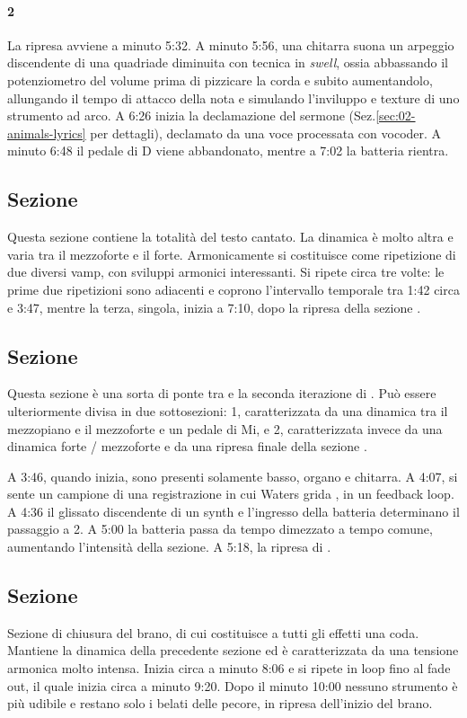 \documentclass[class=book, crop=false, oneside, 12pt]{standalone}
\begin{document}
    \paragraph{2} 
    La ripresa avviene a minuto 5:32. A minuto 5:56,  una chitarra suona un arpeggio discendente di una quadriade diminuita con tecnica in \emph{swell}, ossia abbassando il potenziometro del volume prima di pizzicare la corda e subito aumentandolo, allungando il tempo di attacco della nota e simulando l'inviluppo e texture di uno strumento ad arco. A 6:26 inizia la declamazione del sermone (Sez.\ref{sec:02-animals-lyrics} per dettagli), declamato da una voce processata con vocoder. A minuto 6:48 il pedale di D viene abbandonato, mentre a 7:02 la batteria rientra.

    \subsection{Sezione }
    Questa sezione contiene la totalità del testo cantato. La dinamica è molto altra e varia tra il mezzoforte e il forte. Armonicamente si costituisce come ripetizione di due diversi vamp, con sviluppi armonici interessanti. Si ripete circa tre volte: le prime due ripetizioni sono adiacenti e coprono l'intervallo temporale tra 1:42 circa e 3:47, mentre la terza, singola,  inizia a 7:10, dopo la ripresa della sezione .

    \subsection{Sezione }
    Questa sezione è una sorta di ponte tra  e la seconda iterazione di . Può essere ulteriormente divisa in due sottosezioni: 1, caratterizzata da una dinamica tra il mezzopiano e il mezzoforte e un pedale di Mi, e 2, caratterizzata invece da una dinamica forte / mezzoforte e da una ripresa finale della sezione .

    A 3:46, quando inizia, sono presenti solamente basso, organo e chitarra. A 4:07, si sente un campione  di una registrazione in cui Waters grida , in un feedback loop. A 4:36 il glissato discendente di un synth e l'ingresso della batteria determinano il passaggio a 2. A 5:00 la batteria passa da tempo dimezzato a tempo comune, aumentando l'intensità della sezione. A 5:18, la ripresa di .

    
    \subsection{Sezione }
    Sezione di chiusura del brano, di cui costituisce a tutti gli effetti una coda. Mantiene la dinamica della precedente sezione ed è caratterizzata da una tensione armonica molto intensa. Inizia circa a minuto 8:06 e si ripete in loop fino al fade out, il quale inizia circa a minuto 9:20. Dopo il minuto 10:00 nessuno strumento è più udibile e restano solo i belati delle pecore, in ripresa dell'inizio del brano.
    
\end{document}

